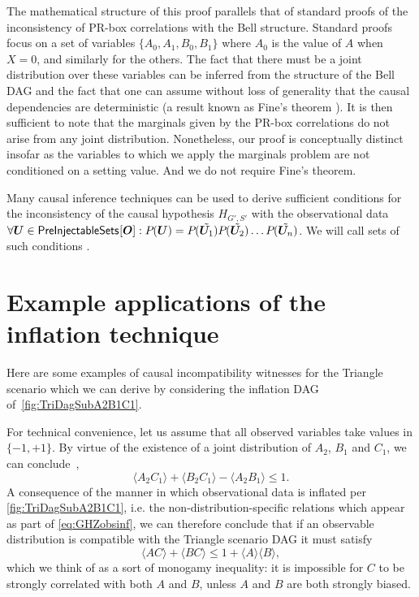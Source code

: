 The mathematical structure of this proof parallels that of standard proofs of the inconsistency of PR-box correlations with the Bell structure.  Standard proofs focus on a set of variables $\{A_0, A_1, B_0, B_1\}$ where $A_0$  is the value of $A$ when $X=0$, and similarly for the others.  The fact that there must be a joint distribution over these variables can be inferred from the structure of the Bell DAG and the fact that one can assume without loss of generality that the causal dependencies are deterministic (a result known as Fine's theorem \cite{FineTheorem}).  It is then sufficient to note that the marginals given by the PR-box correlations do not arise from any joint distribution.  Nonetheless, our proof is conceptually distinct insofar as the variables to which we apply the marginals problem are not conditioned on a setting value.  And we do not require Fine's theorem.  

Many causal inference techniques can be used to derive sufficient conditions for the inconsistency of the causal hypothesis $H_{G',S'}$ with the observational data $\forall \bm{U} \in {\operatorname{\mathsf{PreInjectableSets}}_{}}\lbrack\bm{O}\rbrack: {P_{}}\lparen\bm{U}\rparen = {P_{}}\lparen\tilde{\bm{U}_1}\rparen{P_{}}\lparen\tilde{\bm{U}_2}\rparen \dots {P_{}}\lparen\tilde{\bm{U}_n}\rparen$. We will call sets of such conditions .  

\color{black}
\section{Example applications of the inflation technique}\label{sec:examplebaddistributions}

Here are some examples of causal incompatibility witnesses for the Triangle scenario which we can derive by considering the inflation DAG of~\cref{fig:TriDagSubA2B1C1}.

For technical convenience, let us assume that all observed variables take values in $\{-1,+1\}$. By virtue of the existence of a joint distribution of $A_2$, $B_1$ and $C_1$, we can conclude~\cite{pitowsky_boole_1994,Pitowsky1989,kellerer_marginal_1964,leggett_garg_1985,araujo_cycle_2013},
\begin{equation}
	\label{eq:polymonogamyraw}
	\langle A_2 C_1\rangle + \langle B_2 C_1 \rangle - \langle A_2 B_1 \rangle \leq 1.
\end{equation}
A consequence of the manner in which observational data is inflated per \cref{fig:TriDagSubA2B1C1}, i.e. the non-distribution-specific relations which appear as part of \cref{eq:GHZobsinf}, we can therefore conclude that if an observable distribution is compatible with the Triangle scenario DAG it must satisfy
\begin{equation}
	\label{eq:polymonogamy}
	\langle A C\rangle + \langle B C\rangle \leq 1 + \langle A\rangle \langle B\rangle,
\end{equation}
which we think of as a sort of monogamy inequality: it is impossible for $C$ to be strongly correlated with both $A$ and $B$, unless $A$ and $B$ are both strongly biased.

